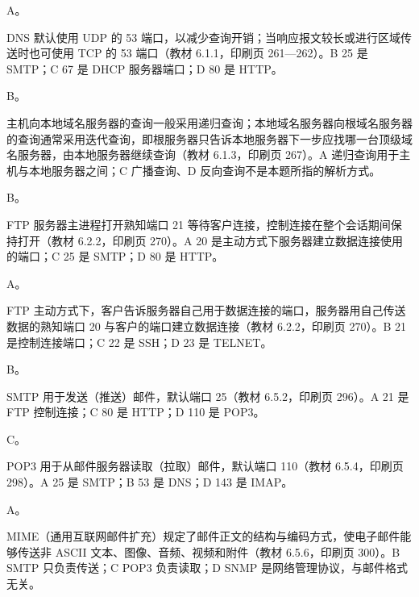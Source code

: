 \documentclass[a4paper,11pt]{article}
\begin{document}


\q A。\begin{analysis}DNS 默认使用 UDP 的 53 端口，以减少查询开销；当响应报文较长或进行区域传送时也可使用 TCP 的 53 端口（教材 6.1.1，印刷页 261—262）。B 25 是 SMTP；C 67 是 DHCP 服务器端口；D 80 是 HTTP。\end{analysis}

\q B。\begin{analysis}主机向本地域名服务器的查询一般采用递归查询；本地域名服务器向根域名服务器的查询通常采用迭代查询，即根服务器只告诉本地服务器下一步应找哪一台顶级域名服务器，由本地服务器继续查询（教材 6.1.3，印刷页 267）。A 递归查询用于主机与本地服务器之间；C 广播查询、D 反向查询不是本题所指的解析方式。\end{analysis}

\q B。\begin{analysis}FTP 服务器主进程打开熟知端口 21 等待客户连接，控制连接在整个会话期间保持打开（教材 6.2.2，印刷页 270）。A 20 是主动方式下服务器建立数据连接使用的端口；C 25 是 SMTP；D 80 是 HTTP。\end{analysis}

\q A。\begin{analysis}FTP 主动方式下，客户告诉服务器自己用于数据连接的端口，服务器用自己传送数据的熟知端口 20 与客户的端口建立数据连接（教材 6.2.2，印刷页 270）。B 21 是控制连接端口；C 22 是 SSH；D 23 是 TELNET。\end{analysis}

\q B。\begin{analysis}SMTP 用于发送（推送）邮件，默认端口 25（教材 6.5.2，印刷页 296）。A 21 是 FTP 控制连接；C 80 是 HTTP；D 110 是 POP3。\end{analysis}

\q C。\begin{analysis}POP3 用于从邮件服务器读取（拉取）邮件，默认端口 110（教材 6.5.4，印刷页 298）。A 25 是 SMTP；B 53 是 DNS；D 143 是 IMAP。\end{analysis}

\q A。\begin{analysis}MIME（通用互联网邮件扩充）规定了邮件正文的结构与编码方式，使电子邮件能够传送非 ASCII 文本、图像、音频、视频和附件（教材 6.5.6，印刷页 300）。B SMTP 只负责传送；C POP3 负责读取；D SNMP 是网络管理协议，与邮件格式无关。\end{analysis}
\end{document}
